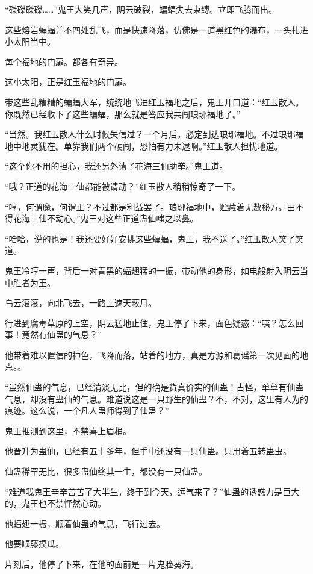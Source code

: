 \begin{this_body}
“磔磔磔磔……”鬼王大笑几声，阴云破裂，蝙蝠失去束缚。立即飞腾而出。

这些熔岩蝙蝠并不四处乱飞，而是快速降落，仿佛是一道黑红色的瀑布，一头扎进小太阳当中。

每个福地的门扉。都各有奇异。

这小太阳，正是红玉福地的门扉。

带这些乱糟糟的蝙蝠大军，统统地飞进红玉福地之后，鬼王开口道：“红玉散人。你既然已经收下了这些蝙蝠，那么就是答应我共闯琅琊福地了。”

“当然。我红玉散人什么时候失信过？一个月后，必定到达琅琊福地。不过琅琊福地中地灵犹在。单靠我们两个硬闯，恐怕有力未逮啊。”红玉散人担忧地道。

“这个你不用的担心，我还另外请了花海三仙助拳。”鬼王道。

“哦？正道的花海三仙都能被请动？”红玉散人稍稍惊奇了一下。

“哼，何谓魔，何谓正？不过都是利益罢了。琅琊福地中，贮藏着无数秘方。由不得花海三仙不动心。”鬼王对这些正道蛊仙嗤之以鼻。

“哈哈，说的也是！我还要好好安排这些蝙蝠，鬼王，我不送了。”红玉散人笑了笑道。

鬼王冷哼一声，背后一对青黑的蝠翅猛的一振，带动他的身形，如电般射入阴云当中胜者为王。

乌云滚滚，向北飞去，一路上遮天蔽月。

行进到腐毒草原的上空，阴云猛地止住，鬼王停了下来，面色疑惑：“咦？怎么回事！竟然有仙蛊的气息？”

他带着难以置信的神色，飞降而落，站着的地方，真是方源和葛谣第一次见面的地点。。

“虽然仙蛊的气息，已经清淡无比，但的确是货真价实的仙蛊！古怪，单单有仙蛊气息，却没有蛊仙的气息。难道说这是一只野生的仙蛊？不，不对，这里有人为的痕迹。这么说，一个凡人蛊师得到了仙蛊？”

鬼王推测到这里，不禁喜上眉梢。

他晋升为蛊仙，已经有五十多年，但手中还没有一只仙蛊。只用着五转蛊虫。

仙蛊稀罕无比，很多蛊仙终其一生，都没有一只仙蛊。

“难道我鬼王辛辛苦苦了大半生，终于到今天，运气来了？”仙蛊的诱惑力是巨大的，鬼王也不禁怦然心动。

他蝠翅一振，顺着仙蛊的气息，飞行过去。

他要顺藤摸瓜。

片刻后，他停了下来，在他的面前是一片鬼脸葵海。


\end{this_body}
